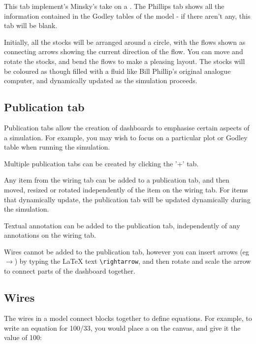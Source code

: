 This tab implement's Minsky's take on a . The
Phillips tab shows all the information contained in the Godley tables
of the model - if there aren't any, this tab will be blank.

Initially, all the stocks will be arranged around a circle, with the
flows shown as connecting arrows showing the current direction of the
flow. You can move and rotate the stocks, and bend the flows to make a
pleasing layout. The stocks will be coloured as though filled with a
fluid like Bill Phillip's original analogue computer, and dynamically
updated as the simulation proceeds.

\subsection{Publication tab}\label{tabs:Publication}

Publication tabs allow the creation of dashboards to emphasise certain
aspects of a simulation. For example, you may wish to focus on a
particular plot or Godley table when running the simulation.

Multiple publication tabs can be created by clicking the '+' tab.

Any item from the wiring tab can be added to a publication tab, and
then moved, resized or rotated independently of the item on the wiring
tab. For items that dynamically update, the publication tab will be
updated dynamically during the simulation.

Textual annotation can be added to the publication tab, independently
of any annotations on the wiring tab.

Wires cannot be added to the publication tab, however you can insert
arrows (eg $\rightarrow$) by typing the LaTeX text \verb+\rightarrow+,
and then rotate and scale the arrow to connect parts of the dashboard together.

\subsection{Wires}
\label{Wires}

The wires in a model connect blocks together to define equations. For
example, to write an equation for 100/33, you would place a
 on the canvas, and give it the value of 100:

\begin{center}
\end{center}

